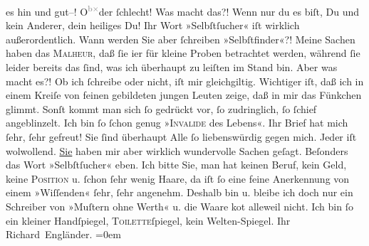 \begin{ledgroupsized}[t]{13cm}
               es hin und gut–! O\substVorne{}\textsuperscript{\textcolor{gray}{b}\textcolor{gray}{×}}\substDazwischen{}de\substHinten{}r ſchlecht! Was macht das?! Wenn nur du es biſt, Du und kein Anderer, dein
               heiliges Du! Ihr Wort »Selbſtſucher« iſt wirklich {\pb}außerordentlich. Wann werden Sie aber ſchreiben »Selbſtfinder«?!\pend
           \pstart
            Meine Sachen haben das \textsc{Malheur}, daß ſie i{\geminationm}er für
               kleine Proben betrachtet werden, während ſie leider bereits das ſind, was ich
               überhaupt zu leiſten im Stand bin. Aber was macht es?! Ob ich ſchreibe oder nicht,
               iſt mir gleichgiltig.\pend
           \pstart
           Wichtiger iſt, daß ich in einem Kreiſe von feinen gebildeten jungen Leuten zeige, daß
                   in mir das Fünkchen glimmt. Sonſt kommt man sich ſo gedrückt vor, ſo
               zudringlich, ſo ſchief angeblinzelt. Ich bin ſo ſchon genug »\textsc{Invalide} des Lebens«.\pend
           \pstart
           Ihr Brief hat mich ſehr, ſehr gefreut! {\pb} Sie ſind überhaupt Alle ſo liebenswürdig gegen mich. Jeder iſt wolwollend. \uline{Sie} haben mir aber wirklich wundervolle Sachen geſagt.
               Beſonders das Wort »Selbſtſucher« eben.\pend
           \pstart
           Ich bitte Sie, man hat keinen Beruf, kein Geld, keine \textsc{Position} u. ſchon ſehr wenig Haare, da iſt ſo eine feine Anerkennung von
               einem »Wiſſenden« ſehr, ſehr angenehm.\pend
           \pstart
           Deshalb bin u. bleibe ich doch nur ein Schreiber von »Muſtern ohne Werth« u. die
               Waare ko{\geminationm}t alleweil nicht. Ich bin ſo ein kleiner
               Handſpiegel, \textsc{Toilette}ſpiegel, kein  Welten-Spiegel.\pend
           \pstart
           Ihr{\\[\baselineskip]}\spacefill\mbox{Richard Engländer.}\pend
           \leftskip=0em{}\endnumbering{}\end{ledgroupsized}  \newcommand{\dateiname}{L00351}\newcommand{\titel}{Peter Altenberg an Arthur Schnitzler, [12. 7. 1894?]}\newcommand{\editorInnen}{Martin Anton Müller und Gerd-Hermann Susen}
      